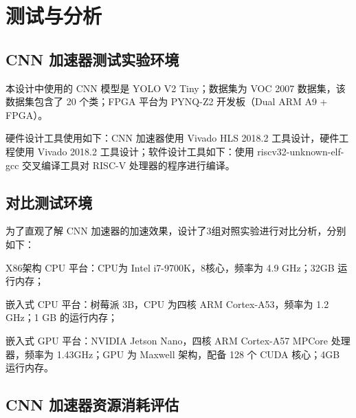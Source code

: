 \chapter{测试与分析}\label{chap:test}

\section{CNN 加速器测试实验环境}

本设计中使用的 CNN 模型是 YOLO V2 Tiny\citep{redmon2017yolo9000}；数据集为 VOC 2007 数据集\citep{everingham2007pascal}，该数据集包含了 20 个类；FPGA 平台为 PYNQ-Z2 开发板（Dual ARM A9 + FPGA）。

硬件设计工具使用如下：CNN 加速器使用 Vivado HLS 2018.2 工具设计，硬件工程使用 Vivado 2018.2 工具设计；软件设计工具如下：使用 riscv32-unknown-elf-gcc 交叉编译工具对 RISC-V 处理器的程序进行编译。

\section{对比测试环境}

为了直观了解 CNN 加速器的加速效果，设计了3组对照实验进行对比分析，分别如下：

X86架构 CPU 平台：CPU为 Intel i7-9700K，8核心，频率为 4.9 GHz；32GB 运行内存；

嵌入式 CPU 平台：树莓派 3B，CPU 为四核 ARM Cortex-A53，频率为 1.2 GHz；1 GB 的运行内存；

嵌入式 GPU 平台：NVIDIA Jetson Nano，四核 ARM Cortex-A57 MPCore 处理器，频率为 1.43GHz；GPU 为 Maxwell 架构，配备 128 个 CUDA 核心；4GB 运行内存。

\section{CNN 加速器资源消耗评估}



